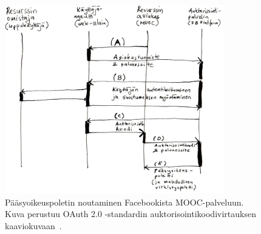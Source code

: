 \documentclass[finnish,gradu]{tktltiki}
\begin{document}
  \begin{figure}[h!]
    \centering
    \includegraphics[width=0.85\textwidth]{images/fb_auth_sekvenssi.jpg}
    \caption{Pääsyoikeuspoletin noutaminen Facebookista MOOC-palveluun. Kuva perustuu OAuth 2.0 -standardin auktorisointikoodivirtauksen kaaviokuvaan~\cite{ietf_oauth2}.}
    \label{fig:oauth_auth_code_flow}
  \end{figure}
\end{document}
